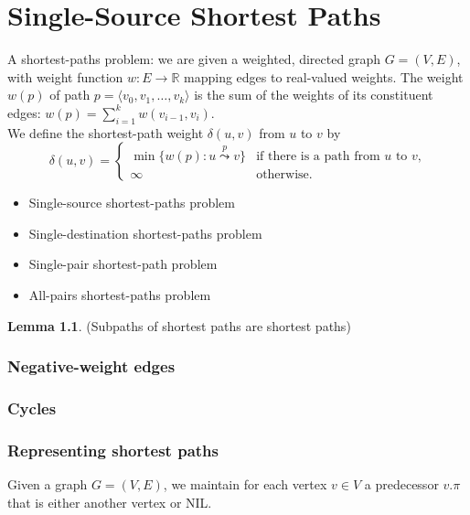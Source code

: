 \documentclass[letter]{book}
\theoremstyle{definition}
\newtheorem{lemma}[theorem]{Lemma}
\theoremstyle{definition}
\theoremstyle{remark}
\begin{document}
\setcounter{chapter}{23}

\chapter{Single-Source Shortest Paths}
A shortest-paths problem: we are given a weighted, directed graph $G=(V,E)$, with weight function $w:E\rightarrow\mathbb{R}$ mapping edges to real-valued weights. The weight $w(p)$ of path $p=\langle v_0,v_1,\ldots, v_k\rangle$ is the sum of the weights of its constituent edges: $w(p)=\sum_{i=1}^{k}{w(v_{i-1},v_i)}$.\\
We define the shortest-path weight $\delta(u,v)$ from $u$ to $v$ by
\begin{equation*}
    \delta(u,v)=
    \begin{cases}
        \min\{w(p):u\overset{p}{\leadsto}v\}  & \text{if there is a path from $u$ to $v$,} \\
        \infty & \text{otherwise.}
    \end{cases}
\end{equation*}
\begin{itemize}
    \item Single-source shortest-paths problem
    \item Single-destination shortest-paths problem
    \item Single-pair shortest-path problem
    \item All-pairs shortest-paths problem
\end{itemize}
\bigskip
\begin{lemma} (Subpaths of shortest paths are shortest paths)
\end{lemma}

\subsection*{Negative-weight edges}

\subsection*{Cycles}

\subsection*{Representing shortest paths}
Given a graph $G=(V,E)$, we maintain for each vertex $v\in V$ a predecessor $v.\pi$ that is either another vertex or NIL.
\end{document}
